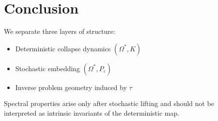 \documentclass[11pt]{article}
\begin{document}
\section{Conclusion}

We separate three layers of structure:

\begin{itemize}
\item Deterministic collapse dynamics $(\Omega^*, K)$
\item Stochastic embedding $(\Omega^*, P_\varepsilon)$
\item Inverse problem geometry induced by $\tau$
\end{itemize}

Spectral properties arise only after stochastic lifting and should not be interpreted as intrinsic invariants of the deterministic map.
\end{document}
